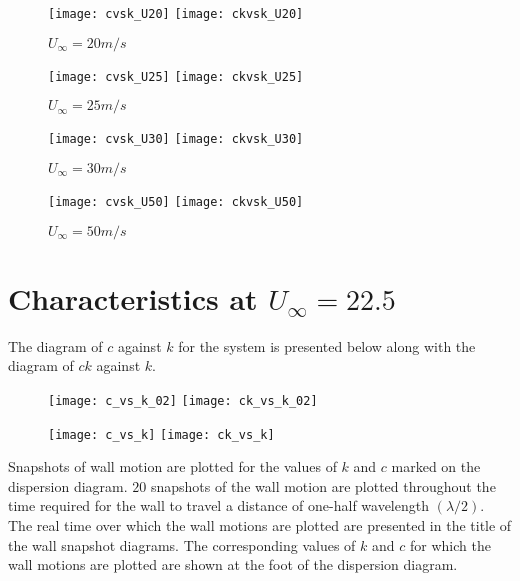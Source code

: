 \documentclass[a4paper,10pt]{article}
\begin{document}
\begin{figure}[htb]
\centering
 \texttt{[image: cvsk\_U20]}
 \texttt{[image: ckvsk\_U20]}
\caption{$U_\infty = 20 m/s$}
\end{figure}

\begin{figure}[htb]
\centering
 \texttt{[image: cvsk\_U25]}
 \texttt{[image: ckvsk\_U25]}
\caption{$U_\infty = 25 m/s$}
\end{figure}

\begin{figure}[htb]
\centering
 \texttt{[image: cvsk\_U30]}
 \texttt{[image: ckvsk\_U30]}
\caption{$U_\infty = 30 m/s$}
\end{figure}

\begin{figure}[htb]
\centering
 \texttt{[image: cvsk\_U50]}
 \texttt{[image: ckvsk\_U50]}
\caption{$U_\infty = 50 m/s$}
\end{figure}


\clearpage
\section{Characteristics at $U_\infty=22.5$}
The diagram of $c$ against $k$ for the system is presented below along with the diagram of $ck$ against $k$.

\begin{figure}[htb]
\centering
 \texttt{[image: c\_vs\_k\_02]}
 \texttt{[image: ck\_vs\_k\_02]}
\end{figure}

\begin{figure}[htb]
\centering
 \texttt{[image: c\_vs\_k]}
 \texttt{[image: ck\_vs\_k]}
\end{figure}

Snapshots of wall motion are plotted for the values of $k$ and $c$ marked on the dispersion diagram.  $20$ snapshots of the wall motion are plotted throughout the time required for the wall to travel a distance of one-half wavelength $(\lambda/2)$.  The real time over which the wall motions are plotted are presented in the title of the wall snapshot diagrams.  The corresponding values of $k$ and $c$ for which the wall motions are plotted are shown at the foot of the dispersion diagram.
\end{document}
